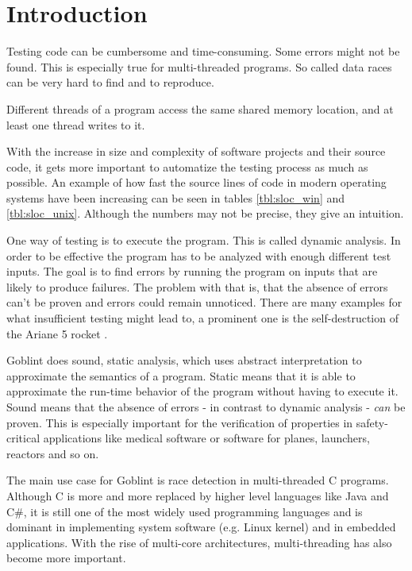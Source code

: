 \chapter{Introduction}
\label{chap:introduction}
Testing code can be cumbersome and time-consuming. Some errors might not be found. This is especially true for multi-threaded programs. So called data races can be very hard to find and to reproduce.

\begin{definition}
 Different threads of a program access the same shared memory location, and at least one thread writes to it.
\end{definition}

With the increase in size and complexity of software projects and their source code, it gets more important to automatize the testing process as much as possible. An example of how fast the source lines of code in modern operating systems have been increasing can be seen in tables \ref{tbl:sloc_win} and \ref{tbl:sloc_unix}. Although the numbers may not be precise, they give an intuition.



One way of testing is to execute the program. This is called dynamic analysis. In order to be effective the program has to be analyzed with enough different test inputs. The goal is to find errors by running the program on inputs that are likely to produce failures. The problem with that is, that the absence of errors can't be proven and errors could remain unnoticed. There are many examples for what insufficient testing might lead to, a prominent one is the self-destruction of the Ariane 5 rocket \cite{Dowson:1997:ASF:251880.251992}.

Goblint does sound, static analysis, which uses abstract interpretation to approximate the semantics of a program. Static means that it is able to approximate the run-time behavior of the program without having to execute it. Sound means that the absence of errors - in contrast to dynamic analysis - \textit{can} be proven. This is especially important for the verification of properties in safety-critical applications like medical software or software for planes, launchers, reactors and so on.

The main use case for Goblint is race detection in multi-threaded C programs. Although C is more and more replaced by higher level languages like Java and C\#, it is still one of the most widely used programming languages and is dominant in implementing system software (e.g. Linux kernel) and in embedded applications. With the rise of multi-core architectures, multi-threading has also become more important.

